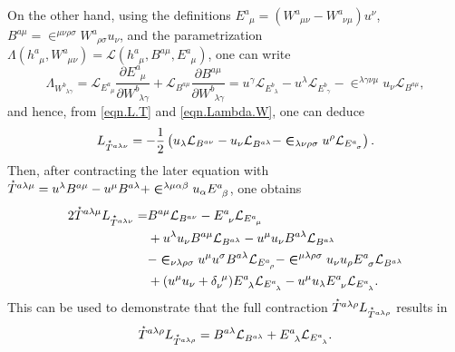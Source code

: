 \documentclass[
10pt, %
a4paper, %
oneside, %
headinclude,footinclude, %
BCOR5mm, %
]{scrartcl}
\newcommand{\tetrsymbol}{h}
\newcommand{\tetr}[2]{\tetrsymbol^{#1}_{\phantom{#1}#2}}
\newcommand{\ET}[2]{E^{#1}_{\phantom{#1}#2}}	%
\newcommand{\BT}[2]{B^{#1#2}}	%
\newcommand{\w}[2]{W^{#1}_{\phantom{#1}#2}}
\newcommand{\Lag}{\Lambda}	%
\newcommand{\Laghodge}{L}%
\newcommand{\LagBE}{\mathcal{L}}%
\newcommand{\LCsymb}{\bm{\in}}    %
\newcommand{\HDT}[1]{\accentset{\star}{T}^{#1}}
\newcommand{\KD}[2]{\delta^{\ #1}_{#2}}
\begin{document}
On the other hand, using the definitions $ \ET{a}{\mu} = (\w{a}{\mu\nu} - \w{a}{\nu\mu})u^\nu $, $ 
\BT{a}{\mu} = \LCsymb^{\mu\nu\rho\sigma}\w{a}{\rho\sigma} u_\nu $, and  the parametrization $ 
\Lag(\tetr{a}{\mu},\w{a}{\mu\nu}) = \LagBE(\tetr{a}{\mu},\BT{a}{\mu},\ET{a}{\mu}) $, one can write
\begin{equation}\label{eqn.Lambda.W}
	\Lag_{\w{b}{\lambda\gamma}} = 
	\LagBE_{\ET{a}{\mu}} \frac{\partial \ET{a}{\mu}}{\partial \w{b}{\lambda\gamma}} 
	+
	\LagBE_{\BT{a}{\mu}} \frac{\partial \BT{a}{\mu}}{\partial \w{b}{\lambda\gamma}} 
	=
	u^\gamma \LagBE_{\ET{b}{\lambda}} - u^\lambda \LagBE_{\ET{b}{\gamma}} - 
	\LCsymb^{\lambda\gamma\nu\mu} u_\nu \LagBE_{\BT{a}{\mu}},
\end{equation}
and hence, from \eqref{eqn.L.T} and \eqref{eqn.Lambda.W}, one can deduce 
\begin{equation}
	\Laghodge_{\HDT{a\lambda\nu}} = -\frac{1}{2} 
	\left(
	u_\lambda \LagBE_{\BT{a}{\nu}} - u_\nu \LagBE_{\BT{a}{\lambda}} 
	-
	\LCsymb_{\lambda\nu\rho\sigma} u^\rho \LagBE_{\ET{a}{\sigma}} 
	\right).
\end{equation}
Then, after contracting the later equation with $ \HDT{a\lambda\mu} = u^\lambda \BT{a}{\mu} - u^\mu 
\BT{a}{\lambda} + \LCsymb^{\lambda\mu\alpha\beta} u_\alpha \ET{a}{\beta} $, one obtains
 \begin{align}\label{eqn.T.L.T} 
 	2 \HDT{a\lambda\mu} \Laghodge_{\HDT{a\lambda\nu}} =
 	&  \BT{a}{\mu}\LagBE_{\BT{a}{\nu}} 
 	 - \ET{a}{\nu}\LagBE_{\ET{a}{\mu}} \\
 	& + u^\lambda u_\nu \BT{a}{\mu} \LagBE_{\BT{a}{\lambda}} - u^\mu u_\nu \BT{a}{\lambda} 
 	\LagBE_{\BT{a}{\lambda}}				\nonumber\\
 	& - \LCsymb_{\nu\lambda\rho\sigma} u^\mu u^\sigma \BT{a}{\lambda} \LagBE_{\ET{a}{\rho}} 
 	  - \LCsymb^{\mu\lambda\rho\sigma} u_\nu u_\rho \ET{a}{\sigma} \LagBE_{\BT{a}{\lambda}}
 	\nonumber \\
 	& + (u^\mu u_\nu + \KD{\mu}{\nu}) \ET{a}{\lambda} \LagBE_{\ET{a}{\lambda}} - u^\mu u_\lambda 
 	\ET{a}{\nu} \LagBE_{\ET{a}{\lambda}}.
 	\nonumber
 \end{align}
This can be used to demonstrate that the full contraction  $ 	\HDT{a\lambda\rho} 
\Laghodge_{\HDT{a\lambda\rho}} $ results in
\begin{equation}\label{eqn.T.L.T.full}
	\HDT{a\lambda\rho} \Laghodge_{\HDT{a\lambda\rho}}
	=
	\BT{a}{\lambda} \LagBE_{\BT{a}{\lambda}} + \ET{a}{\lambda} \LagBE_{\ET{a}{\lambda}}.
\end{equation}
\end{document}
